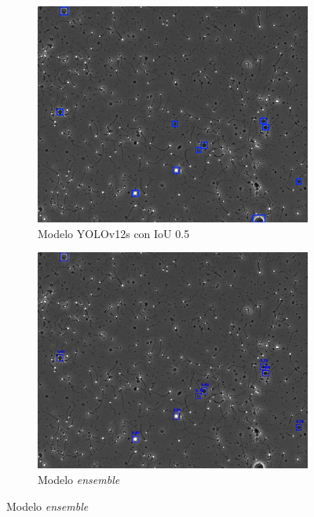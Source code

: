 \documentclass[12pt,a4paper,onecolumn,oneside]{report}
\begin{document}
\begin{figure}[H]
  \vspace{0.3cm} 
  
  \begin{subfigure}[b]{0.48\textwidth}
    \centering
    \includegraphics[width=\textwidth]{figuras/evaluacion_cualitativa/9/9_v12.jpg}
    \caption{Modelo YOLOv12s con IoU 0.5}
    \label{fig:yolov12s_IoU0.5_image_9}
  \end{subfigure}
  \hfill
  \begin{subfigure}[b]{0.48\textwidth}
    \centering
    \includegraphics[width=\textwidth]{figuras/evaluacion_cualitativa/9/9_ensemble.jpg}
    \caption{Modelo \textit{ensemble}}
    \label{fig:ensemble_image_9}
  \end{subfigure}
  

\end{figure}
\end{document}
